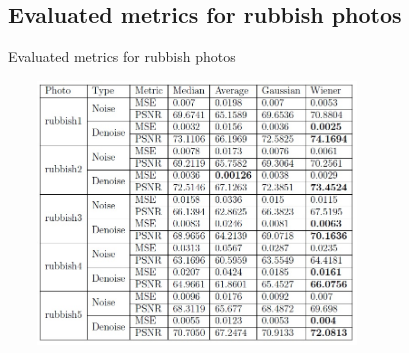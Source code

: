 \documentclass{beamer}
\begin{document}
\subsection{Evaluated metrics for rubbish photos}
\begin{frame}{Evaluated metrics for rubbish photos}
\begin{center}
\includegraphics[width=10cm,height=7cm]{rub1.jpg}
\end{center}


\end{frame}
\end{document}
